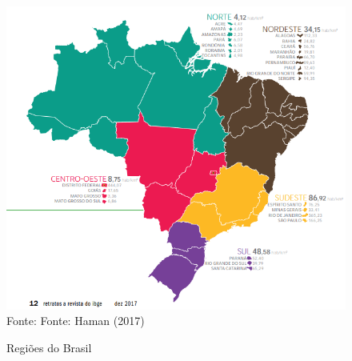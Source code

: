 \begin{figure}[ht]
    \centering
    \caption{Regiões do Brasil}
    \includegraphics[width=1\linewidth]{figuras/regioes/regioes_brasil.PNG}
    \label{fig:regioes_brasil}
    \footnotesize{Fonte: Fonte: Haman (2017)}
\end{figure}
